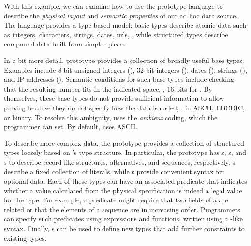 \documentclass[10pt]{article}
\begin{document}
With this example, we can examine how to use the prototype 
\pads{} language to describe 
the {\em physical layout} and 
{\em semantic properties} of our ad hoc data source. 
The language provides a type-based model:
basic types describe atomic data such as integers, characters, 
strings, dates, urls, \etc, while
structured types describe compound data built from simpler pieces.

In a bit more detail,
\pads{} prototype provides a collection of broadly useful base
types.  Examples include 8-bit unsigned integers (), 32-bit
integers (), dates (), strings (),
and IP addresses ().  Semantic conditions for such base types
include checking that the resulting number fits in the indicated
space, \ie, 16-bits for .  By themselves, these base types
do not provide sufficient information to allow parsing because they do
not specify how the data is coded, \ie{}, in ASCII, EBCDIC, or binary.
To resolve this ambiguity, \pads{} uses the \textit{ambient} coding,
which the programmer can set.  By default, \pads{} uses ASCII.  

To describe more complex data, the prototype provides a collection of
structured types loosely based on \C{}'s type structure.  In
particular, the prototype has s, s, and s
to describe record-like structures, alternatives, and sequences,
respectively.  s describe a fixed collection of literals,
while s provide convenient syntax for optional data.  Each of
these types can have an associated predicate that indicates whether a
value calculated from the physical specification is indeed a legal
value for the type.  For example, a predicate might require that two
fields of a  are related or that the elements of a
sequence are in increasing order.  Programmers can specify such
predicates using \pads{} expressions and functions, written using a
\C{}-like syntax.  Finally, \pads{} s can be used to
define new types that add further constraints to existing types.
\end{document}
